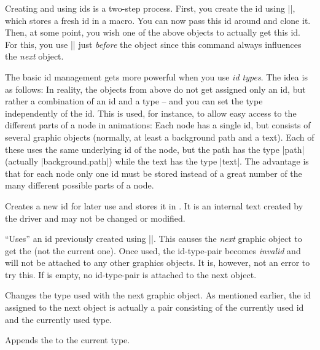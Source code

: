 Creating and using ids is a two-step process. First, you create the
id using |\pgfsys@new@id|, which stores a fresh id in a macro. You can
now pass this id around and clone it. Then, at some point, you wish
one of the above objects to actually get this id. For this, you use
|\pgfsys@use@id| just \emph{before} the object since this command
always influences the \emph{next} object.

The basic id management gets more powerful when you use \emph{id
  types}. The idea is as follows: In reality, the objects from above
do not get assigned only an id, but rather a combination of an id and
a type -- and you can set the type independently of the id. This is
used, for instance, to allow easy access to the different parts of a
node in animations: Each node has a single id, but consists of several
graphic objects (normally, at least a background path and a
text). Each of these uses the same underlying id of the node, but the
path has the type |path| (actually |background.path|) while the text
has the type |text|. The advantage is that for each node only one id
must be stored instead of a great number of the many different
possible parts of a node.

\begin{command}{\pgfsys@new@id{}}
  Creates a new id for later use and stores it in . It is
  an internal text created by the driver and may not be changed or
  modified. 
\end{command}

\begin{command}{\pgfsys@use@id{}}
  ``Uses'' an id previously created using |\pgfsys@new@id|. This
  causes the \emph{next} graphic object to get the  (not the
  current one). Once used, the id-type-pair becomes \emph{invalid} and
  will not be attached to any other graphics objects. It is, however,
  not an error to try this. If  is empty, no id-type-pair is
  attached to the next object.
\end{command}

\begin{command}{\pgfsys@use@type{}}
  Changes the type used with the next graphic object.
  As mentioned earlier, the id assigned to the next object is actually
  a pair consisting of the currently used id and the currently used
  type. 
\end{command}

\begin{command}{\pgfsys@append@type{}}
  Appends the  to the current type. 
\end{command}


